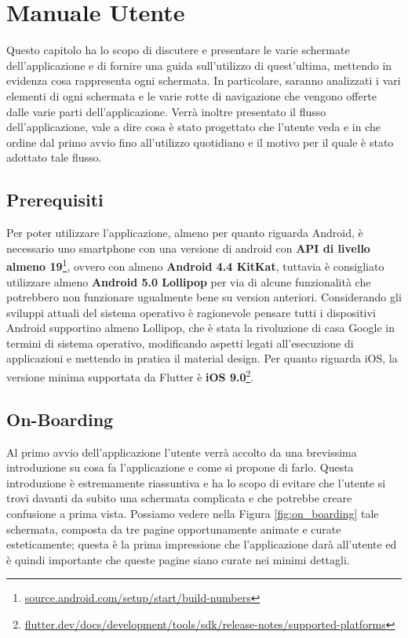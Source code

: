 \chapter{Manuale Utente}
\label{chap:manuale_utente}
Questo capitolo ha lo scopo di discutere e presentare le varie schermate dell'applicazione e di fornire una guida sull'utilizzo di quest'ultima, mettendo in evidenza cosa rappresenta ogni schermata. In particolare, saranno analizzati i vari elementi di ogni schermata e le varie rotte di navigazione che vengono offerte dalle varie parti dell'applicazione. Verrà inoltre presentato il flusso dell'applicazione, vale a dire cosa è stato progettato che l'utente veda e in che ordine dal primo avvio fino all'utilizzo quotidiano e il motivo per il quale è stato adottato tale flusso.

\section{Prerequisiti}
Per poter utilizzare l'applicazione, almeno per quanto riguarda Android, è necessario uno smartphone con una versione di android con \textbf{API di livello almeno 19}\footnote{\url{source.android.com/setup/start/build-numbers}}, ovvero con almeno \textbf{Android 4.4 KitKat}, tuttavia è consigliato utilizzare almeno \textbf{Android 5.0 Lollipop} per via di alcune funzionalità che potrebbero non funzionare ugualmente bene su version anteriori. Considerando gli sviluppi attuali del sistema operativo è ragionevole pensare tutti i dispositivi Android supportino almeno Lollipop, che è stata la rivoluzione di casa Google in termini di sistema operativo, modificando aspetti legati all'esecuzione di applicazioni e mettendo in pratica il material design. Per quanto riguarda iOS, la versione minima supportata da Flutter è \textbf{iOS 9.0}\footnote{\url{flutter.dev/docs/development/tools/sdk/release-notes/supported-platforms}}.

\newpage
\section{On-Boarding}
Al primo avvio dell'applicazione l'utente verrà accolto da una brevissima introduzione su cosa fa l'applicazione e come si propone di farlo. Questa introduzione è estremamente riassuntiva e ha lo scopo di evitare che l'utente si trovi davanti da subito una schermata complicata e che potrebbe creare confusione a prima vista. Possiamo vedere nella Figura \ref{fig:on_boarding} tale schermata, composta da tre pagine opportunamente animate e curate esteticamente; questa è la prima impressione che l'applicazione darà all'utente ed è quindi importante che queste pagine siano curate nei minimi dettagli.

